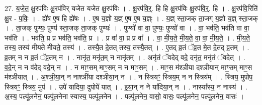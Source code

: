 \documentclass[17pt]{extarticle}
\begin{document}
27. य॒जे॒त॒ क्षु॒रप॑विः क्षु॒रप॑विर् यजेत यजेत क्षु॒रप॑विः । . क्षु॒रप॑वि॒र्॒. हि हि क्षु॒रप॑विः क्षु॒रप॑वि॒र्॒. हि । . क्षु॒रप॑वि॒रिति॑ क्षु॒र - प॒विः॒ । . ह्ये॑ष ए॒ष हि ह्ये॑षः । . ए॒ष य॒ज्ञो य॒ज्ञ् ए॒ष ए॒ष य॒ज्ञ्ः । . य॒ज्ञ् स्ता॒जक् ता॒जग् य॒ज्ञो य॒ज्ञ् स्ता॒जक् । . ता॒जक् पुण्यः॒ पुण्य॑ स्ता॒जक् ता॒जक् पुण्यः॑ । . पुण्यो॑ वा वा॒ पुण्यः॒ पुण्यो॑ वा । . वा॒ भव॑ति॒ भव॑ति वा वा॒ भव॑ति । . भव॑ति॒ प्र प्र भव॑ति॒ भव॑ति॒ प्र । . प्र वा॑ वा॒ प्र प्र वा᳚ । . वा॒ मी॒य॒ते॒ मी॒य॒ते॒ वा॒ वा॒ मी॒य॒ते॒ । . मी॒य॒ते॒ तस्य॒ तस्य॑ मीयते मीयते॒ तस्य॑ । . तस्यै॒त दे॒तत् तस्य॒ तस्यै॒तत् । . ए॒तद् व्र॒तं ॅव्र॒त मे॒त दे॒तद् व्र॒तम् । . व्र॒तम् न न व्र॒तं ॅव्र॒तम् न । . नानृ॑त॒ मनृ॑त॒म् न नानृ॑तम् । . अनृ॑तं ॅवदेद् वदे॒ दनृ॑त॒ मनृ॑तं ॅवदेत् । . व॒दे॒न् न न व॑देद् वदे॒न् न । . न माꣳ॒॒सम् माꣳ॒॒सम् न न माꣳ॒॒सम् । . माꣳ॒॒स म॑श्ञीया दश्ञीयान् माꣳ॒॒सम् माꣳ॒॒स म॑श्ञीयात् । . अ॒श्ञी॒या॒न् न नाश्ञी॑या दश्ञीया॒न् न । . न स्त्रियꣳ॒॒ स्त्रिय॒म् न न स्त्रिय᳚म् । . स्त्रिय॒ मुपोप॒ स्त्रियꣳ॒॒ स्त्रिय॒ मुप॑ । . उपे॑ यादिया॒ दुपोपे॑ यात् । . इ॒या॒न् न ने या॑दिया॒न् न । . नास्या᳚स्य॒ न नास्य॑ । . अ॒स्य॒ पल्पू॑लनेन॒ पल्पू॑लनेना स्यास्य॒ पल्पू॑लनेन । . पल्पू॑लनेन॒ वासो॒ वासः॒ पल्पू॑लनेन॒ पल्पू॑लनेन॒ वासः॑ । \newline
\end{document}
